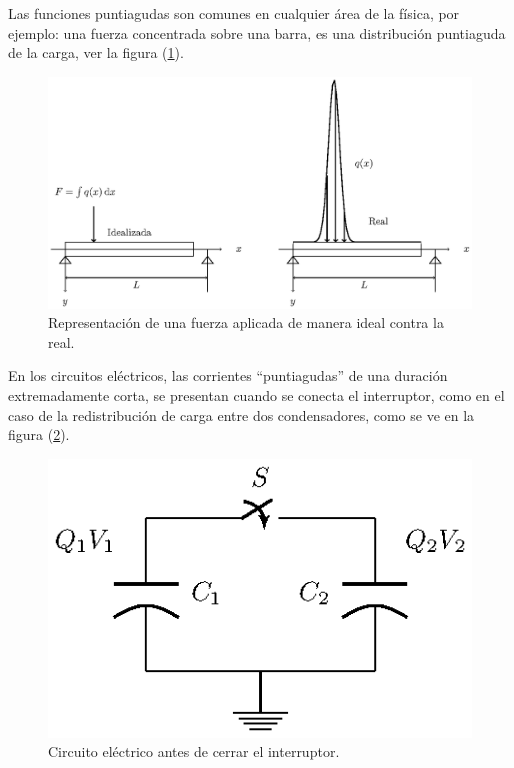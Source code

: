 Las funciones puntiagudas son comunes en cualquier área de la física, por ejemplo: una fuerza concentrada sobre una barra, es una distribución puntiaguda de la carga, ver la figura (\ref{fig:figura_delta_Dirac_02}). 
\begin{figure}[H]
    \centering
    \includegraphics[scale=1]{Imagenes/delta_Dirac_02.eps}
    \caption{Representación de una fuerza aplicada de manera ideal contra la real.}
    \label{fig:figura_delta_Dirac_02}
\end{figure}

En los circuitos eléctricos, las corrientes \enquote{puntiagudas} de una duración extremadamente corta, se presentan cuando se conecta el interruptor, como en el caso de la redistribución de carga entre dos condensadores, como se ve en la figura (\ref{fig_figura_delta_Dirac_03}).
\begin{figure}[H]
    \centering
    \includegraphics[scale=1.4]{Imagenes/delta_Dirac_03.eps}
    \caption{Circuito eléctrico antes de cerrar el interruptor.}
    \label{fig_figura_delta_Dirac_03}
\end{figure}

